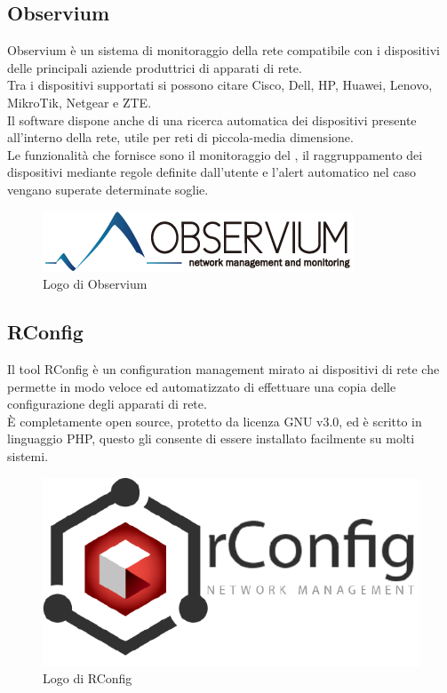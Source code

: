 \documentclass[Tesi.tex]{subfiles}
\begin{document}
\subsection{Observium}
Observium è un sistema di monitoraggio della rete compatibile con i dispositivi delle principali aziende produttrici di apparati di rete. \\
Tra i dispositivi supportati si possono citare Cisco, Dell, HP, Huawei, Lenovo, MikroTik, Netgear e ZTE. \\
Il software dispone anche di una ricerca automatica dei dispositivi presente all'interno della rete, utile per reti di piccola-media dimensione. \\
Le funzionalità che fornisce sono il monitoraggio del , il raggruppamento dei dispositivi mediante regole definite dall'utente e l'alert automatico nel caso vengano superate determinate soglie.
\begin{figure}[H]
	\centering
	\includegraphics[width=0.5\linewidth]{"images/logo/Observium_logo"}
	\caption{Logo di Observium}
	\label{fig:Logo di Observium}
\end{figure}

\subsection{RConfig}
Il tool RConfig è un configuration management mirato ai dispositivi di rete che permette in modo veloce ed automatizzato di effettuare una copia delle configurazione degli apparati di rete. \\
\`{E} completamente open source, protetto da licenza GNU v3.0, ed è scritto in linguaggio PHP, questo gli consente di essere installato facilmente su molti sistemi.
\begin{figure}[H]
	\centering
	\includegraphics[width=0.5\linewidth]{"images/logo/rConfig_logo"}
	\caption{Logo di RConfig}
	\label{fig:Logo di RConfig}
\end{figure}
\end{document}
